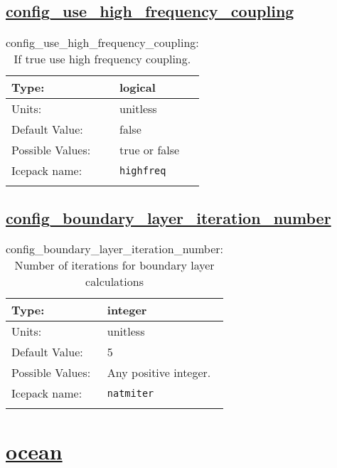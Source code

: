 \subsection[config\_use\_high\_frequency\_coupling]{\hyperref[sec:nm_tab_atmosphere]{config\_use\_high\_frequency\_coupling}}
\label{subsec:nm_sec_config_use_high_frequency_coupling}
\begin{center}
\begin{longtable}{| p{2.0in} || p{4.0in} |}
    \hline
    Type: & logical \\
    \hline
    Units: & \si{unitless} \\
    \hline
    Default Value: & false \\
    \hline
    Possible Values: & true or false \\
    \hline
    Icepack name: & \verb+highfreq+ \\
    \hline
    \caption{config\_use\_high\_frequency\_coupling: If true use high frequency coupling.}
\end{longtable}
\end{center}
\subsection[config\_boundary\_layer\_iteration\_number]{\hyperref[sec:nm_tab_atmosphere]{config\_boundary\_layer\_iteration\_number}}
\label{subsec:nm_sec_config_boundary_layer_iteration_number}
\begin{center}
\begin{longtable}{| p{2.0in} || p{4.0in} |}
    \hline
    Type: & integer \\
    \hline
    Units: & \si{unitless} \\
    \hline
    Default Value: & 5 \\
    \hline
    Possible Values: & Any positive integer. \\
    \hline
    Icepack name: & \verb+natmiter+ \\
    \hline
    \caption{config\_boundary\_layer\_iteration\_number: Number of iterations for boundary layer calculations}
\end{longtable}
\end{center}
\section[ocean]{\hyperref[sec:nm_tab_ocean]{ocean}}
\label{sec:nm_sec_ocean}
